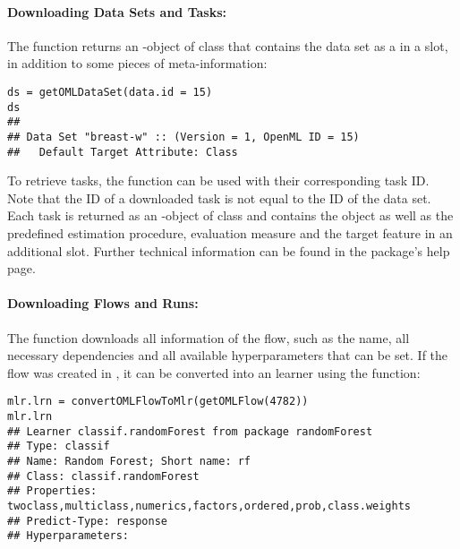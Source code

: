\paragraph{Downloading Data Sets and Tasks:}
The  function returns an -object of class
 that contains the data set as a  in a
 slot, in addition to some pieces of meta-information:

\begin{knitrout}\small
{}\color{fgcolor}\begin{kframe}
\begin{verbatim}
ds = getOMLDataSet(data.id = 15)
ds
## 
## Data Set "breast-w" :: (Version = 1, OpenML ID = 15)
##   Default Target Attribute: Class
\end{verbatim}
\end{kframe}
\end{knitrout}

To retrieve tasks, the  function can be used with their corresponding task ID.
Note that the ID of a downloaded task is not equal to the ID of the data set.
Each task is returned as an -object of class  and
contains the  object as well as the predefined
estimation procedure, evaluation measure and the target feature in an additional
 slot. Further technical information can be found in the package's
help page. %


\paragraph{Downloading Flows and Runs:}
The  function downloads all information of the flow, such as
the name, all necessary dependencies and all available hyperparameters that can be set.
If the flow was created in , it can be converted into an  
learner using the  function:

\begin{knitrout}\small
{}\color{fgcolor}\begin{kframe}
\begin{verbatim}
mlr.lrn = convertOMLFlowToMlr(getOMLFlow(4782))
mlr.lrn
## Learner classif.randomForest from package randomForest
## Type: classif
## Name: Random Forest; Short name: rf
## Class: classif.randomForest
## Properties: twoclass,multiclass,numerics,factors,ordered,prob,class.weights
## Predict-Type: response
## Hyperparameters:
\end{verbatim}
\end{kframe}
\end{knitrout}

